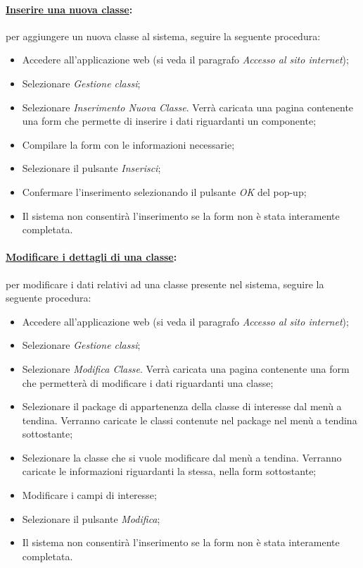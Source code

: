 \paragraph{\underline{Inserire una nuova classe}:}
per aggiungere un nuova classe al sistema, seguire la seguente procedura:
\begin{itemize}
\item Accedere all'applicazione web (si veda il paragrafo \textit{Accesso al sito internet});
\item Selezionare \textit{Gestione classi};
\item Selezionare \textit{Inserimento Nuova Classe}. Verrà caricata una pagina contenente una form che permette di inserire i dati riguardanti un componente;
\item Compilare la form con le informazioni necessarie;
\item Selezionare il pulsante \textit{Inserisci};
\item Confermare l'inserimento selezionando il pulsante \textit{OK} del pop-up;
\item Il sistema non consentirà l'inserimento se la form non è stata interamente completata.
\end{itemize}

\paragraph{\underline{Modificare i dettagli di una classe}:}
per modificare i dati relativi ad una classe presente nel sistema, seguire la seguente procedura:
\begin{itemize}
\item Accedere all'applicazione web (si veda il paragrafo \textit{Accesso al sito internet});
\item Selezionare \textit{Gestione classi};
\item Selezionare \textit{Modifica Classe}. Verrà caricata una pagina contenente una form che permetterà di modificare i dati riguardanti una classe;
\item Selezionare il package\g{} di appartenenza della classe di interesse dal menù a tendina. Verranno caricate le classi contenute nel package\g{} nel menù a tendina sottostante;
\item Selezionare la classe che si vuole modificare dal menù a tendina. Verranno caricate le informazioni riguardanti la stessa, nella form sottostante;
\item Modificare i campi di interesse;
\item Selezionare il pulsante \textit{Modifica};
\item Il sistema non consentirà l'inserimento se la form non è stata interamente completata.
\end{itemize}

